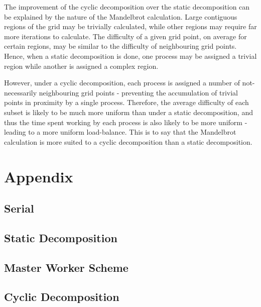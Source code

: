 \documentclass{article}
\begin{document}
The improvement of the cyclic decomposition over the static decomposition can be
explained by the nature of the Mandelbrot calculation.
Large contiguous regions of the grid may be trivially calculated, while other
regions may require far more iterations to calculate.
The difficulty of a given grid point, on average for certain regions, may be
similar to the difficulty of neighbouring grid points.
Hence, when a static decomposition is done, one process may be assigned a
trivial region while another is assigned a complex region.

However, under a cyclic decomposition, each process is assigned a number of
not-necessarily neighbouring grid points - preventing the accumulation of
trivial points in proximity by a single process.
Therefore, the average difficulty of each subset is likely to be much more
uniform than under a static decomposition, and thus the time spent working by
each process is also likely to be more uniform - leading to a more uniform
load-balance.
This is to say that the Mandelbrot calculation is more suited to a cyclic
decomposition than a static decomposition.

\clearpage
\appendix
\section{Appendix}
\label{sec:appendix}

\subsection{Serial}
\label{sec:serial-code}



\newpage
\subsection{Static Decomposition}
\label{sec:static-code}



\newpage
\subsection{Master Worker Scheme}
\label{sec:master-worker-code}



\newpage
\subsection{Cyclic Decomposition}
\label{sec:cyclic-code}


\end{document}
